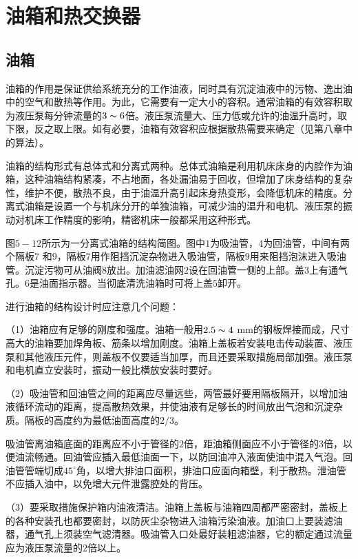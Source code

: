 
\section{油箱和热交换器}
\subsection{油箱}

油箱的作用是保证供给系统充分的工作油液，同时具有沉淀油液中的污物、逸出油中的空气和散热等作用。为此，它需要有一定大小的容积。通常油箱的有效容积取为液压泵每分钟流量的$3\thicksim 6$倍。液压泵流量大、压力低或允许的油温升高时，取下限，反之取上限。如有必要，油箱有效容积应根据散热需要来确定（见第八章中的算法）。

油箱的结构形式有总体式和分离式两种。总体式油箱是利用机床床身的内腔作为油箱，这种油箱结构紧凑，不占地面，各处漏油易于回收，但增加了床身结构的复杂性，维护不便，散热不良，由于油温升高引起床身热变形，会降低机床的精度。分离式油箱是设置一个与机床分开的单独油箱，可减少油的温升和电机、液压泵的振动对机床工作精度的影响，精密机床一般都采用这种形式。

图$5-12$所示为一分离式油箱的结构简图。图中$1$为吸油管，$4$为回油管，中间有两个隔板$7$ 和$9$，隔板$7$用作阻挡沉淀杂物进入吸油管，隔板$9$用来阻挡泡沫进入吸油管。沉淀污物可从油阀$8$放出。加油滤油网$2$设在回油管一侧的上部。盖$3$上有通气孔。$6$是油面指示器。当彻底清洗油箱时可将上盖$5$卸开。

进行油箱的结构设计时应注意几个问题：

（1）油箱应有足够的刚度和强度。油箱一般用$2.5 \thicksim 4$ mm的钢板焊接而成，尺寸高大的油箱要加焊角板、筋条以增加刚度。油箱上盖板若安装电击传动装置、液压泵和其他液压元件，则盖板不仅要适当加厚，而且还要采取措施局部加强。液压泵和电机直立安装时，振动一般比横放安装时要好。

（2）吸油管和回油管之间的距离应尽量远些，两管最好要用隔板隔开，以增加油液循环流动的距离，提高散热效果，并使油液有足够长的时间放出气泡和沉淀杂质。隔板的高度约为最低油面高度的$2/3$。

吸油管离油箱底面的距离应不小于管径的$2$倍，距油箱侧面应不小于管径的$3$倍，以便油流畅通。回油管应插入最低油面一下，以防回油冲入液面使油中混入气泡。回油管管端切成$45^\circ$角，以增大排油口面积，排油口应面向箱壁，利于散热。泄油管不应插入油中，以免增大元件泄露腔处的背压。

（3）要采取措施保护箱内油液清洁。油箱上盖板与油箱四周都严密密封，盖板上的各种安装孔也都要密封，以防灰尘杂物进入油箱污染油液。加油口上要装滤油器，通气孔上须装空气滤清器。吸油管入口处最好装粗滤油器，它的额定通过流量应为液压泵流量的$2$倍以上。


